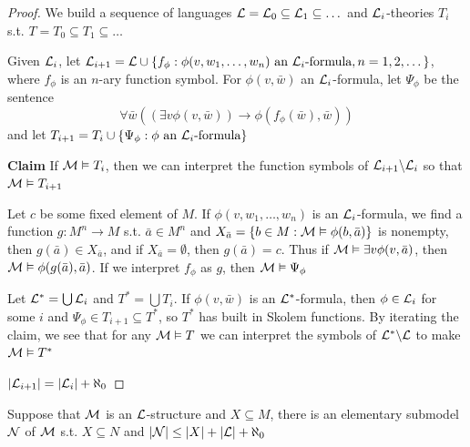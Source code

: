 \documentclass[11pt]{article}
\begin{document}
\begin{proof}
We build a sequence of languages
\(\mathcal{L}=\mathcal{L}_0\subseteq\mathcal{L}_1\subseteq\dots\) and \(\mathcal{L}_i\)-theories
\(T_i\) s.t. \(T=T_0\subseteq T_1\subseteq\dots\)

Given \(\mathcal{L}_i\), let \(\mathcal{L}_{i+1}=\mathcal{L}\cup\{f_\phi:\phi(v,w_1,\dots,w_n)\text{ an }\mathcal{L}_i\text{-formula},n=1,2,\dots\}\),
where \(f_\phi\) is an \(n\)-ary function symbol. For \(\phi(v,\bar{w})\) an
\(\mathcal{L}_i\)-formula, let \(\Psi_\phi\) be the sentence
\begin{equation*}
\forall\bar{w}((\exists v\phi(v,\bar{w}))\to\phi(f_\phi(\bar{w}),\bar{w}))
\end{equation*}
and let \(T_{i+1}=T_i\cup\{\Psi_\phi:\phi\text{ an }\mathcal{L}_i\text{-formula}\}\)

\textbf{Claim} If \(\mathcal{M}\vDash T_i\), then we can interpret the function symbols of
\(\mathcal{L}_{i+1}\backslash\mathcal{L}_i\) so that \(\mathcal{M}\vDash T_{i+1}\)

Let \(c\) be some fixed element of \(M\). If \(\phi(v,w_1,\dots,w_n)\) is an
\(\mathcal{L}_i\)-formula, we find a function \(g:M^n\to M\) s.t. 
\(\bar{a}\in M^n\) and \(X_{\bar{a}}=\{b\in M:\mathcal{M}\vDash\phi(b,\bar{a})\}\)
is nonempty, then \(g(\bar{a})\in X_{\bar{a}}\), and if
\(X_{\bar{a}}=\emptyset\), then \(g(\bar{a})=c\). Thus if 
\(\mathcal{M}\vDash\exists v\phi(v,\bar{a})\), then
\(\mathcal{M}\vDash\phi(g(\bar{a}),\bar{a})\). If we interpret \(f_\phi\) as
\(g\), then \(\mathcal{M}\vDash\Psi_\phi\)

Let \(\mathcal{L}^*=\bigcup\mathcal{L}_i\) and \(T^*=\bigcup T_i\). If \(\phi(v,\bar{w})\)
is an \(\mathcal{L}^*\)-formula, then \(\phi\in\mathcal{L}_i\) for some \(i\) and 
\(\Psi_\phi\in T_{i+1}\subseteq T^*\), so \(T^*\) has built in Skolem
functions. By iterating the claim, we see that for any \(\mathcal{M}\vDash T\) we
can interpret the symbols of \(\mathcal{L}^*\backslash\mathcal{L}\) to make
\(\mathcal{M}\vDash T^*\)

\(\abs{\call_{i+1}}=\abs{\call_i}+\aleph_0\)
\end{proof}

\begin{theorem}
Suppose that \(\mathcal{M}\) is an \(\mathcal{L}\)-structure and \(X\subseteq M\), there
is an elementary submodel \(\mathcal{N}\) of \(\mathcal{M}\) s.t. \(X\subseteq N\) and 
\(\abs{\caln}\le\abs{X}+\abs{\call}+\aleph_0\)
\end{theorem}
\end{document}
